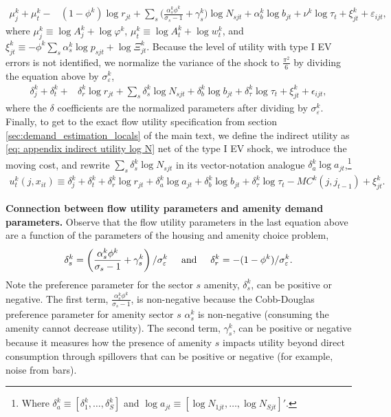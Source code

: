\documentclass[11pt]{article}
\newcommand{\spaceand}{\hspace{5mm}\text{and}\hspace{5mm}}
\newcommand{\Paragraph}{\vspace{0.1cm}\noindent\textbf}
\begin{document}
\begin{align*}
   \mu_j^k + \mu_t^k - & (1-\phi^k) \log r_{jt} +  \sum_s \big(\frac{\alpha^k_{s}\phi^k}{\sigma_s-1}  + \gamma^k_s\big)\log N_{sjt} + \alpha^k_b\log b_{jt} + \nu^k \log \tau_t + \xi_{jt}^k + \varepsilon_{ijt}, 
\end{align*}
where $\mu_j^k \equiv \log A_j^k + \log \varphi^k$, 
$\mu_t^k \equiv \log A_t^k + \log w_t^k$, and  $\xi_{jt}^k \equiv  - \phi^k \sum_s \alpha^k_{s} \log p_{sjt} + \log \Xi_{jt}^k $. Because the level of utility with type I EV errors is not identified, we normalize the variance of the shock to $\frac{\pi^2}{6}$ by dividing the equation above by $\sigma^k_\varepsilon$,
\begin{align}\label{eq: appendix indirect utility log N}
   \delta_j^k + \delta_t^k + & \delta_{r}^k \log r_{jt} + \sum_s  \delta_{s}^k \log N_{sjt} + \delta_{b}^k \log b_{jt} + \delta_{\tau}^k \log \tau_t + \xi_{jt}^k + \epsilon_{ijt},
\end{align}
where the $\delta$ coefficients are the normalized parameters after dividing by $\sigma_\varepsilon^k$. Finally, to get to the exact flow utility specification from section \ref{sec:demand_estimation_locals} of the main text, we define the indirect utility as \ref{eq: appendix indirect utility log N} net of the type I EV shock, we introduce the moving cost, and rewrite $\sum_s  \delta_{s}^k \log N_{sjt}$ in its vector-notation analogue $\delta_{a}^k \log a_{jt}$,\footnote{Where  $\delta_{a}^k\equiv[\delta_{1}^k,\dots, \delta_{S}^k]$ and $\log a_{jt}\equiv[\log N_{1jt},\dots,\log N_{Sjt}]'$.}
\begin{align*}
     u^k_t(j, x_{it}) \equiv \delta_j^k + \delta_t^k + \delta_{r}^k \log r_{jt} + \delta_{a}^k \log a_{jt} + \delta_{b}^k \log b_{jt} + \delta_{\tau}^k \log \tau_t - MC^k(j,j_{t-1})  + \xi_{jt}^k.
\end{align*}

\Paragraph{Connection between flow utility parameters and amenity demand parameters.} Observe that the flow utility parameters in the last equation above are a function of the parameters of the housing and amenity choice problem,
\begin{align*}
    \delta^k_s = \left(\frac{\alpha^k_{s}\phi^k}{\sigma_s-1}  + \gamma^k_s \right)/\sigma^k_\varepsilon \spaceand \delta^k_r = -(1-\phi^k)/\sigma^k_\varepsilon.
\end{align*}
Note the preference parameter for the sector $s$ amenity, $\delta^k_s$, can be positive or negative. The first term, $\frac{\alpha^k_{s}\phi^k}{\sigma_s-1}$, is non-negative because the Cobb-Douglas preference parameter for amenity sector $s$ $\alpha_s^k$ is non-negative (consuming the amenity cannot decrease utility). The second term, $\gamma^k_s$, can be positive or negative because it measures how the presence of amenity $s$ impacts utility beyond direct consumption through spillovers that can be positive or negative (for example, noise from bars). 
\end{document}
